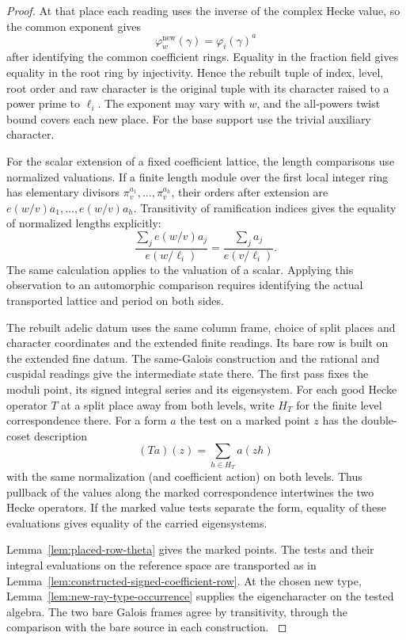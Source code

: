 \begin{proof}
At that place
each reading uses the inverse of the complex Hecke value, so
the common exponent gives
\[
             \varphi^{\mathrm{new}}_{w}(\gamma)
                         =\varphi_i(\gamma)^a
\]
after identifying the common coefficient rings. Equality in
the fraction field gives equality in the root ring by
injectivity. Hence the rebuilt tuple of index, level, root order
and raw character is the original tuple with its character
raised to a power prime to \(\ell_i\). The exponent may vary
with \(w\), and the all-powers twist bound covers each new place.
For the base support use the trivial auxiliary character.
\par
For the scalar extension of a fixed coefficient lattice, the
length comparisons use normalized valuations. If a finite
length module over the first local integer ring has elementary
divisors \(\pi_v^{a_1},\ldots,\pi_v^{a_h}\), their orders after
extension are \(e(w/v)a_1,\ldots,e(w/v)a_h\). Transitivity of ramification indices gives the equality of
normalized lengths explicitly:
\[
 \frac{\sum_j e(w/v)a_j}{e(w/\ell_i)}
       =\frac{\sum_j a_j}{e(v/\ell_i)} .
\] The same calculation applies to the
valuation of a scalar. Applying this observation to an
automorphic comparison requires identifying the actual
transported lattice and period on both sides.
\label{cor:automorphic-realization-56}

The rebuilt adelic datum uses the same column frame,
choice of split places and character coordinates and the
extended finite readings. Its bare row is built on the
extended fine datum. The same-Galois construction and the
rational and cuspidal readings give the intermediate state
there. The first pass fixes the moduli point, its signed integral series and its eigensystem. For each good Hecke operator \(T\) at a split place away from both levels, write \(H_T\) for the finite level correspondence there. For a form \(a\) the test on a marked point \(z\) has the double-coset description
\[
             (Ta)(z)=\sum_{h\in H_T}a(zh)
\]
with the same normalization (and coefficient action) on both levels. Thus pullback of the values along the marked correspondence intertwines the two Hecke operators. If the marked value tests separate the form, equality of these evaluations gives equality of the carried eigensystems. 

Lemma~\ref{lem:placed-row-theta} gives the marked points. The tests and their integral evaluations on the reference space are transported as in Lemma~\ref{lem:constructed-signed-coefficient-row}. At the chosen new type, Lemma~\ref{lem:new-ray-type-occurrence} supplies the eigencharacter on the tested algebra. The two bare Galois
frames agree by transitivity, through the comparison
with the bare source in each construction.
\label{cor:automorphic-realization-57}


\end{proof}
